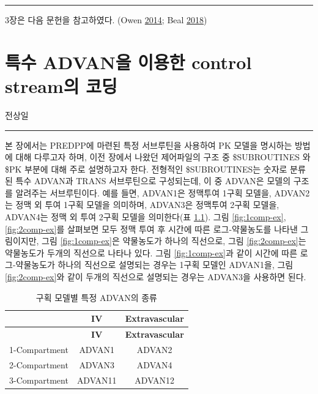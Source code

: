 \documentclass[
  10pt,
  krantz2,
  a4paper]{krantz}
\theoremstyle{definition}
\theoremstyle{definition}
\theoremstyle{definition}
\theoremstyle{remark}
\begin{document}
\begin{center}\rule{0.5\linewidth}{0.5pt}\end{center}

3장은 다음 문헌을 참고하였다. (Owen \protect\hyperlink{ref-kelly}{2014}; Beal \protect\hyperlink{ref-nonmem}{2018})

\hypertarget{specific-advan}{%
\chapter{특수 ADVAN을 이용한 control stream의 코딩}\label{specific-advan}}


전상일

\begin{center}\rule{0.5\linewidth}{0.5pt}\end{center}

본 장에서는 PREDPP에 마련된 특정 서브루틴을 사용하여 PK 모델을 명시하는 방법에 대해 다루고자 하며, 이전 장에서 나왔던 제어파일의 구조 중 \$SUBROUTINES 와 \$PK 부분에 대해 주로 설명하고자 한다. 전형적인 \$SUBROUTINES는 숫자로 분류된 특수 ADVAN과 TRANS 서브루틴으로 구성되는데, 이 중 ADVAN은 모델의 구조를 알려주는 서브루틴이다. 예를 들면, ADVAN1은 정맥투여 1구획 모델을, ADVAN2는 정맥 외 투여 1구획 모델을 의미하며, ADVAN3은 정맥투여 2구획 모델을, ADVAN4는 정맥 외 투여 2구획 모델을 의미한다(표 \ref{tab:specific-advan}). 그림 \ref{fig:1comp-ex}, \ref{fig:2comp-ex}를 살펴보면 모두 정맥 투여 후 시간에 따른 로그-약물농도를 나타낸 그림이지만, 그림 \ref{fig:1comp-ex}은 약물농도가 하나의 직선으로, 그림 \ref{fig:2comp-ex}는 약물농도가 두개의 직선으로 나타나 있다. 그림 \ref{fig:1comp-ex}과 같이 시간에 따른 로그-약물농도가 하나의 직선으로 설명되는 경우는 1구획 모델인 ADVAN1을, 그림 \ref{fig:2comp-ex}와 같이 두개의 직선으로 설명되는 경우는 ADVAN3을 사용하면 된다.

\begin{longtable}[]{@{}ccc@{}}
\caption{\label{tab:specific-advan} 구획 모델별 특정 ADVAN의 종류}\tabularnewline
\toprule
& \textbf{IV} & \textbf{Extravascular}\tabularnewline
\midrule
\endfirsthead
\toprule
& \textbf{IV} & \textbf{Extravascular}\tabularnewline
\midrule
\endhead
1-Compartment & ADVAN1 & ADVAN2\tabularnewline
2-Compartment & ADVAN3 & ADVAN4\tabularnewline
3-Compartment & ADVAN11 & ADVAN12\tabularnewline
\bottomrule
\end{longtable}
\end{document}

